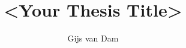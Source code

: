 \documentclass[english]{GayaUKM}
\title{<Your Thesis Title>}
\author{Gijs van Dam}
\begin{document}
\maketitle

\frontmatter
\declaration








\tableofcontents
\listoffigures
\listoftables




\mainmatter








\appendix


\end{document}
